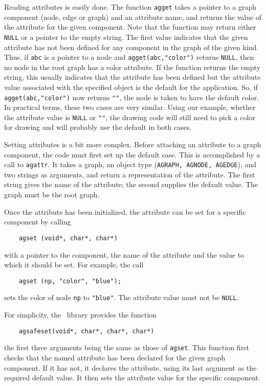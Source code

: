 Reading attributes is easily done. The function {\tt agget} takes a pointer
to a graph component (node, edge or graph) and an attribute name, and
returns the value of the attribute for the given component. Note that the
function may return either {\tt NULL} or a pointer to the empty string.
The first value indicates that the given attribute has not been defined for
any component in the graph of the given kind. Thus, if {\tt abc} is a
pointer to a node and {\tt agget(abc,"color")} returns {\tt NULL}, then
no node in the root graph has a color attribute. If the function returns
the empty string, this usually indicates that the attribute has been 
defined but the attribute value associated with the specified object is the
default for the application. So, if {\tt agget(abc,"color")} 
now returns {\tt ""}, the node is taken to have the default color. In
practical terms, these two cases are very similar. Using our example,
whether the attribute value is {\tt NULL} or {\tt ""}, the drawing code
will still need to pick a color for drawing and will probably use the
default in both cases.

Setting attributes is a bit more complex. Before attaching an attribute
to a graph component, the code must first set up the default case. This
is accomplished by a call to {\tt agattr}.
It takes a graph, an object type ({\tt AGRAPH, AGNODE, AGEDGE}), and
two strings as arguments, and return a representation of the attribute.
The first string gives the name of the attribute; the second supplies
the default value.
The graph must be the root graph.

Once the attribute has been initialized, the attribute can be set for
a specific component by calling 
\begin{verbatim}
    agset (void*, char*, char*)
\end{verbatim}
with a pointer to the component,
the name of the attribute and the value to which it should be set.
For example, the call
\begin{verbatim}
    agset (np, "color", "blue");
\end{verbatim}
sets the color of node {\tt np} to {\tt "blue"}.
The attribute value must not be {\tt NULL}.

For simplicity, the \graph\ library provides the function
\begin{verbatim}
    agsafeset(void*, char*, char*, char*)
\end{verbatim}
the first three arguments
being the same as those of {\tt agset}. This function first checks that
the named attribute has been declared for the given graph component.
If it has not, it declares the attribute, using its last argument as
the required default value. It then sets the attribute value for the
specific component.

